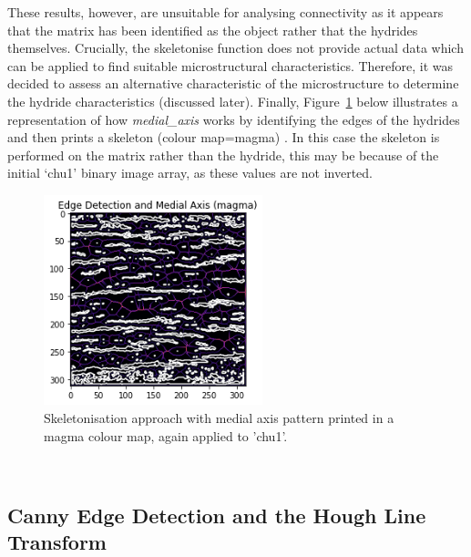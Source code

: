\documentclass{article}
\begin{document}
	These results, however, are unsuitable for analysing connectivity as it appears that the matrix has been identified as the object rather that the hydrides themselves. Crucially, the skeletonise function does not provide actual data which can be applied to find suitable microstructural characteristics. Therefore, it was decided to assess an alternative characteristic of the microstructure to determine the hydride characteristics (discussed later). Finally, Figure~\ref{MedialAxis} below illustrates a representation of how \textit{medial\_axis} works by identifying the edges of the hydrides and then prints a skeleton (colour map=magma) \cite{ScikitimageA}. In this case the skeleton is performed on the matrix rather than the hydride, this may be because of the initial ‘chu1’ binary image array, as these values are not inverted.
	\\
	\begin{figure}[h]
		\centering
		\includegraphics[width=2.5in]{Figures/Medial_Axis_Chu1} 
		\caption{Skeletonisation approach with medial axis pattern printed in a magma colour map, again applied to 'chu1'.}
		\label{MedialAxis}
	\end{figure}
	\\
	\subsection{Canny Edge Detection and the Hough Line Transform}
	
\end{document}
